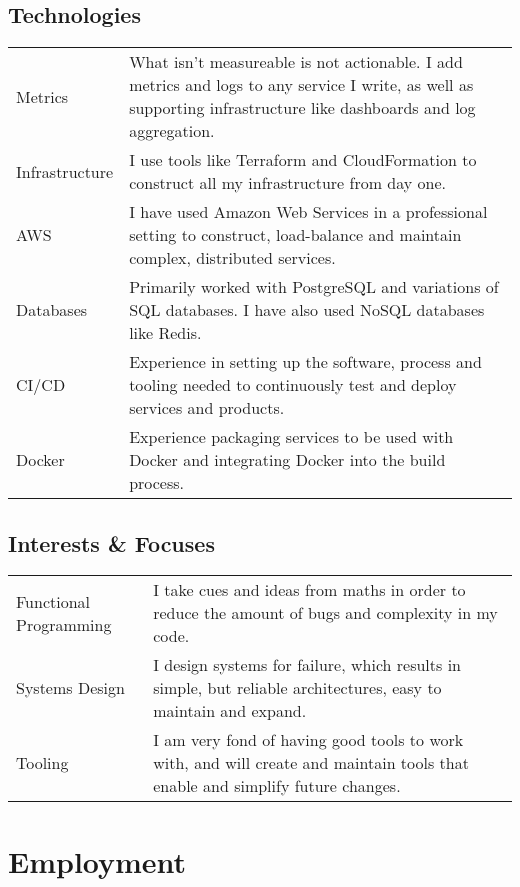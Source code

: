 \documentclass[a4paper]{article}
\begin{document}
\subsection*{Technologies}
\begin{tabular}{ p{3cm} | p{13cm} }
Metrics & What isn't measureable is not actionable. I add metrics and logs to
any service I write, as well as supporting infrastructure like dashboards and
log aggregation. \\
Infrastructure & I use tools like Terraform and CloudFormation to
construct all my infrastructure from day one. \\
AWS & I have used Amazon Web Services in a professional setting to construct, load-balance and
maintain complex, distributed services. \\
Databases & Primarily worked with PostgreSQL and variations of SQL
databases. I have also used NoSQL databases like Redis. \\
CI/CD & Experience in setting up the software, process and tooling needed
to continuously test and deploy services and products.\\
Docker & Experience packaging services to be used with Docker and
integrating Docker into the build process.
\end{tabular}

\subsection*{Interests \& Focuses}
\begin{tabular}{ p{3cm} | p{13cm} }
Functional \linebreak Programming & I take cues and ideas from maths in order to reduce the
amount of bugs and complexity in my code.\\
Systems Design & I design systems for failure, which results in simple,
but reliable architectures, easy to maintain and expand.\\
Tooling & I am very fond of having good tools to work with, and will create and
maintain tools that enable and simplify future changes. \\
\end{tabular}

\section*{Employment}
\end{document}
